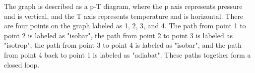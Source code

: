 The graph is described as a p-T diagram, where the p axis represents pressure and is vertical, and the T axis represents temperature and is horizontal. There are four points on the graph labeled as 1, 2, 3, and 4. The path from point 1 to point 2 is labeled as "isobar", the path from point 2 to point 3 is labeled as "isotrop", the path from point 3 to point 4 is labeled as "isobar", and the path from point 4 back to point 1 is labeled as "adiabat". These paths together form a closed loop.